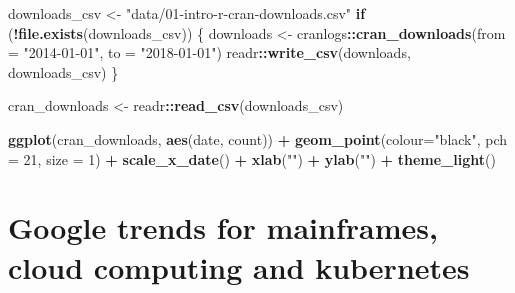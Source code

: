 \documentclass[]{book}
\newenvironment{Shaded}{\begin{snugshade}}{\end{snugshade}}
\newcommand{\ControlFlowTok}[1]{\textcolor[rgb]{0.13,0.29,0.53}{\textbf{#1}}}
\newcommand{\DataTypeTok}[1]{\textcolor[rgb]{0.13,0.29,0.53}{#1}}
\newcommand{\DecValTok}[1]{\textcolor[rgb]{0.00,0.00,0.81}{#1}}
\newcommand{\KeywordTok}[1]{\textcolor[rgb]{0.13,0.29,0.53}{\textbf{#1}}}
\newcommand{\NormalTok}[1]{#1}
\newcommand{\OperatorTok}[1]{\textcolor[rgb]{0.81,0.36,0.00}{\textbf{#1}}}
\newcommand{\StringTok}[1]{\textcolor[rgb]{0.31,0.60,0.02}{#1}}
\theoremstyle{definition}
\theoremstyle{definition}
\theoremstyle{definition}
\theoremstyle{remark}
\begin{document}
\begin{Shaded}
\begin{Highlighting}[]
\NormalTok{downloads_csv <-}\StringTok{ "data/01-intro-r-cran-downloads.csv"}
\ControlFlowTok{if}\NormalTok{ (}\OperatorTok{!}\KeywordTok{file.exists}\NormalTok{(downloads_csv)) \{}
\NormalTok{  downloads <-}\StringTok{ }\NormalTok{cranlogs}\OperatorTok{::}\KeywordTok{cran_downloads}\NormalTok{(}\DataTypeTok{from =} \StringTok{"2014-01-01"}\NormalTok{, }\DataTypeTok{to =} \StringTok{"2018-01-01"}\NormalTok{)}
\NormalTok{  readr}\OperatorTok{::}\KeywordTok{write_csv}\NormalTok{(downloads, downloads_csv)}
\NormalTok{\}}

\NormalTok{cran_downloads <-}\StringTok{ }\NormalTok{readr}\OperatorTok{::}\KeywordTok{read_csv}\NormalTok{(downloads_csv)}

\KeywordTok{ggplot}\NormalTok{(cran_downloads, }\KeywordTok{aes}\NormalTok{(date, count)) }\OperatorTok{+}\StringTok{ }
\StringTok{  }\KeywordTok{geom_point}\NormalTok{(}\DataTypeTok{colour=}\StringTok{"black"}\NormalTok{, }\DataTypeTok{pch =} \DecValTok{21}\NormalTok{, }\DataTypeTok{size =} \DecValTok{1}\NormalTok{) }\OperatorTok{+}
\StringTok{  }\KeywordTok{scale_x_date}\NormalTok{() }\OperatorTok{+}
\StringTok{  }\KeywordTok{xlab}\NormalTok{(}\StringTok{""}\NormalTok{) }\OperatorTok{+}
\StringTok{  }\KeywordTok{ylab}\NormalTok{(}\StringTok{""}\NormalTok{) }\OperatorTok{+}
\StringTok{  }\KeywordTok{theme_light}\NormalTok{()}
\end{Highlighting}
\end{Shaded}

\hypertarget{cluster-trends}{%
\section{Google trends for mainframes, cloud computing and
kubernetes}\label{cluster-trends}}

\begin{Shaded}
\end{Shaded}


\end{document}
